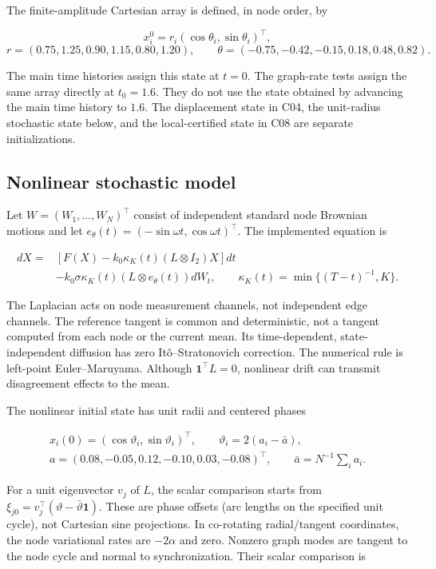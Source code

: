\documentclass[11pt,a4paper]{article}
\begin{document}
The finite-amplitude Cartesian array is defined, in node order, by

\[
x_i^0=r_i(\cos\theta_i,\sin\theta_i)^\top,
\] \[
r=(0.75,1.25,0.90,1.15,0.80,1.20),\qquad
\theta=(-0.75,-0.42,-0.15,0.18,0.48,0.82).
\]

The main time histories assign this state at \(t=0\). The graph-rate
tests assign the same array directly at \(t_0=1.6\). They do not use the
state obtained by advancing the main time history to \(1.6\). The
displacement state in C04, the unit-radius stochastic state below, and
the local-certified state in C08 are separate initializations.

\subsection{Nonlinear stochastic model}\label{c01-stochastic}

Let \(W=(W_1,\ldots,W_N)^\top\) consist of independent standard node
Brownian motions and let
\(e_\theta(t)=(-\sin\omega t,\cos\omega t)^\top\). The implemented
equation is

\[
\begin{aligned}
dX={}&[F(X)-k_0\kappa_K(t)(L\otimes I_2)X]dt\\
&-k_0\sigma\kappa_K(t)(L\otimes e_\theta(t))dW_t,
\qquad \kappa_K(t)=\min\{(T-t)^{-1},K\}.
\end{aligned}\tag{E02}
\]

The Laplacian acts on node measurement channels, not independent edge
channels. The reference tangent is common and deterministic, not a
tangent computed from each node or the current mean. Its time-dependent,
state-independent diffusion has zero Itô--Stratonovich correction. The
numerical rule is left-point Euler--Maruyama. Although
\(\mathbf1^\top L=0\), nonlinear drift can transmit disagreement effects
to the mean.

The nonlinear initial state has unit radii and centered phases

\[
\begin{gathered}
x_i(0)=(\cos\vartheta_i,\sin\vartheta_i)^\top,\qquad \vartheta_i=2(a_i-\bar a),\\
a=(0.08,-0.05,0.12,-0.10,0.03,-0.08)^\top,\qquad \bar a=N^{-1}\sum_i a_i.
\end{gathered}
\]

For a unit eigenvector \(v_j\) of \(L\), the scalar comparison starts
from \(\xi_{j0}=v_j^\top(\vartheta-\bar\vartheta\mathbf1)\). These are
phase offsets (arc lengths on the specified unit cycle), not Cartesian
sine projections. In co-rotating radial/tangent coordinates, the node
variational rates are \(-2\alpha\) and zero. Nonzero graph modes are
tangent to the node cycle and normal to synchronization. Their scalar
comparison is
\end{document}
